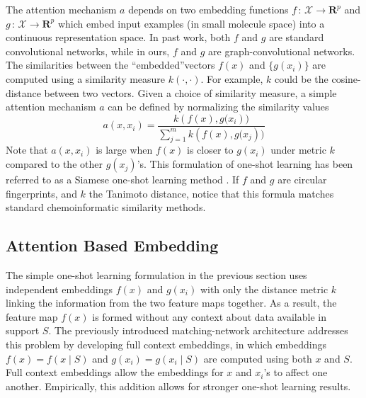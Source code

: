 \documentclass[journal=jacsat,manuscript=article]{achemso}
\begin{document}
The attention mechanism $a$ depends on two embedding functions $f\,:\,\mathcal{X}\rightarrow\mathbf{R}^p$ and $g\,:\,\mathcal{X}\rightarrow\mathbf{R}^p$ which embed input examples (in small molecule space) into a continuous representation space. In past work, both $f$ and $g$ are standard convolutional networks, while in ours, $f$ and $g$ are graph-convolutional networks. The similarities between the ``embedded''vectors $f(x)$ and $\{g(x_i)\}$ are computed using a similarity measure $k(\cdot,\cdot)$.  For example, $k$ could be the cosine-distance between two vectors. Given a choice of similarity measure, a simple attention mechanism $a$ can be defined by normalizing the similarity values
\[
a(x,x_i) = \frac{k\left(f(x),g(x_i\right))}{\sum\nolimits_{j=1}^{m} k\left(f(x),g(x_j\right))}
\]
Note that $a(x,x_i)$ is large when $f(x)$ is closer to $g(x_i)$ under metric $k$ compared to the other $g(x_j)$'s. This formulation of one-shot learning has been referred to as a Siamese one-shot learning method \cite{koch2015siamese}. If $f$ and $g$ are circular fingerprints\cite{rogers2010extended}, and $k$ the Tanimoto distance, notice that this formula matches standard chemoinformatic similarity methods.


\subsection{Attention Based Embedding}

The simple one-shot learning formulation in the previous section uses independent embeddings $f(x)$ and $g(x_i)$ with only the distance metric $k$ linking the information from the two feature maps together. As a result, the feature map $f(x)$ is formed without any context about data available in support $S$. The previously introduced matching-network architecture \cite{vinyals2016matching} addresses this problem by developing full context embeddings, in which embeddings $f(x)=f(x\mid S)$ and $g(x_i)=g(x_i\mid S)$ are computed using both $x$ and $S$. Full context embeddings allow the embeddings for $x$ and $x_i$'s to affect one another. Empirically, this addition allows for stronger one-shot learning results.
\end{document}
